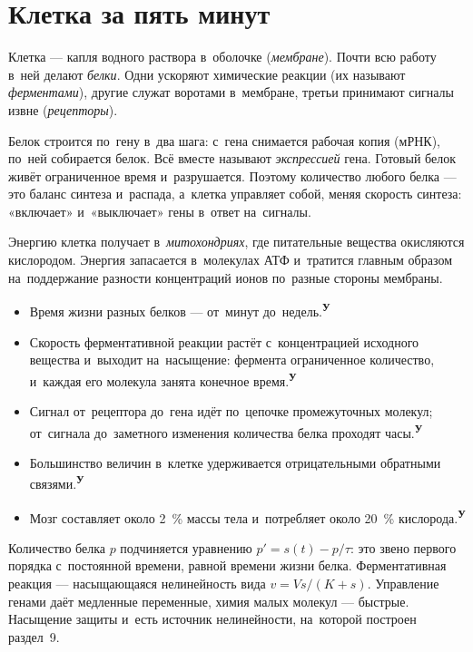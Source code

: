 \documentclass[11pt,a4paper,landscape,twocolumn]{article}
\newcommand{\tU}{\textsuperscript{\sffamily\bfseries\color{cM}У}}
\newcommand{\facts}{\par\vspace{3pt}{\sffamily\bfseries\small\color{cM}Опорные факты}\par\vspace{-2pt}}
\begin{document}
\section{Клетка за пять минут}
Клетка — капля водного раствора в~оболочке (\emph{мембране}). Почти всю работу в~ней делают \emph{белки}. Одни ускоряют химические реакции (их называют \emph{ферментами}), другие служат воротами в~мембране, третьи принимают сигналы извне (\emph{рецепторы}).

Белок строится по~гену в~два шага: с~гена снимается рабочая копия (мРНК), по~ней собирается белок. Всё вместе называют \emph{экспрессией} гена. Готовый белок живёт ограниченное время и~разрушается. Поэтому количество любого белка — это баланс синтеза и~распада, а~клетка управляет собой, меняя скорость синтеза: «включает» и~«выключает» гены в~ответ на~сигналы.

Энергию клетка получает в~\emph{митохондриях}, где питательные вещества окисляются кислородом. Энергия запасается в~молекулах АТФ и~тратится главным образом на~поддержание разности концентраций ионов по~разные стороны мембраны.
\facts
\begin{itemize}
\item Время жизни разных белков — от~минут до~недель.\tU
\item Скорость ферментативной реакции растёт с~концентрацией исходного вещества и~выходит на~насыщение: фермента ограниченное количество, и~каждая его молекула занята конечное время.\tU
\item Сигнал от~рецептора до~гена идёт по~цепочке промежуточных молекул; от~сигнала до~заметного изменения количества белка проходят часы.\tU
\item Большинство величин в~клетке удерживается отрицательными обратными связями.\tU
\item Мозг составляет около 2~\% массы тела и~потребляет около 20~\% кислорода.\tU
\end{itemize}
\begin{ineq}
Количество белка $p$ подчиняется уравнению $p' = s(t) - p/\tau$: это звено первого порядка с~постоянной времени, равной времени жизни белка. Ферментативная реакция — насыщающаяся нелинейность вида $v = V s/(K + s)$. Управление генами даёт медленные переменные, химия малых молекул — быстрые. Насыщение защиты и~есть источник нелинейности, на~которой построен раздел~9.
\end{ineq}

\end{document}
